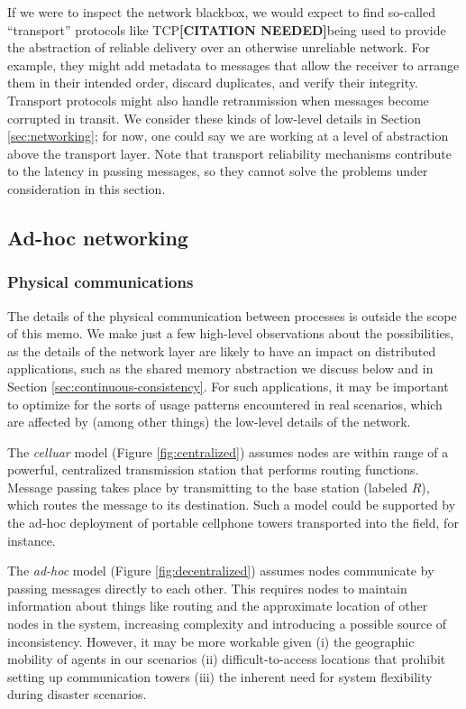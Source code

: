 \documentclass[]             %
{NASA}                       %
\theoremstyle{definition}
\newcommand{\citationneeded}{\textbf{[CITATION NEEDED]}}
\begin{document}
If we were to inspect the network blackbox, we would expect to find
so-called ``transport'' protocols like TCP\citationneeded being used
to provide the abstraction of reliable delivery over an otherwise
unreliable network. For example, they might add metadata to messages
that allow the receiver to arrange them in their intended order,
discard duplicates, and verify their integrity. Transport protocols
might also handle retranmission when messages become corrupted in
transit. We consider these kinds of low-level details in Section
\ref{sec:networking}; for now, one could say we are working at a level
of abstraction above the transport layer. Note that transport
reliability mechanisms contribute to the latency in passing messages,
so they cannot solve the problems under consideration in this section.


\subsection{Ad-hoc networking}
\label{ad-hoc-networking}

\subsubsection{Physical communications}
\label{physical-communications}

The details of the physical communication between processes is outside
the scope of this memo. We make just a few high-level observations about
the possibilities, as the details of the network layer are likely to
have an impact on distributed applications, such as the shared memory
abstraction we discuss below and in Section
\ref{sec:continuous-consistency}. For such applications, it may be
important to optimize for the sorts of usage patterns encountered in
real scenarios, which are affected by (among other things) the low-level
details of the network.

The \emph{celluar} model (Figure \ref{fig:centralized}) assumes nodes
are within range of a powerful, centralized transmission station that
performs routing functions. Message passing takes place by transmitting
to the base station (labeled \(R\)), which routes the message to its
destination. Such a model could be supported by the ad-hoc deployment of
portable cellphone towers transported into the field, for instance.

The \emph{ad-hoc} model (Figure \ref{fig:decentralized}) assumes nodes
communicate by passing messages directly to each other. This requires
nodes to maintain information about things like routing and the
approximate location of other nodes in the system, increasing complexity
and introducing a possible source of inconsistency. However, it may be
more workable given (i) the geographic mobility of agents in our
scenarios (ii) difficult-to-access locations that prohibit setting up
communication towers (iii) the inherent need for system flexibility
during disaster scenarios.
\end{document}
